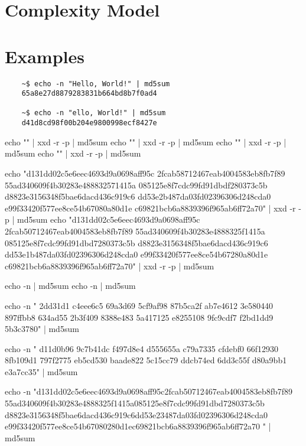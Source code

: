 \section{Complexity Model}


\section{Examples}

\begin{verbatim}
    ~$ echo -n "Hello, World!" | md5sum 
    65a8e27d8879283831b664bd8b7f0ad4
    
    ~$ echo -n "ello, World!" | md5sum 
    d41d8cd98f00b204e9800998ecf8427e
\end{verbatim}

echo "" | xxd -r -p | md5sum
echo "" | xxd -r -p | md5sum
echo "" | xxd -r -p | md5sum
echo "" | xxd -r -p | md5sum

echo "d131dd02c5e6eec4693d9a0698aff95c 2fcab58712467eab4004583eb8fb7f89 55ad340609f4b30283e488832571415a 085125e8f7cdc99fd91dbdf280373c5b d8823e3156348f5bae6dacd436c919c6 dd53e2b487da03fd02396306d248cda0 e99f33420f577ee8ce54b67080a80d1e c69821bcb6a8839396f965ab6ff72a70" | xxd -r -p | md5sum
echo "d131dd02c5e6eec4693d9a0698aff95c 2fcab50712467eab4004583eb8fb7f89 55ad340609f4b30283e4888325f1415a 085125e8f7cdc99fd91dbd7280373c5b d8823e3156348f5bae6dacd436c919c6 dd53e1b487da03fd02396306d248cda0 e99f33420f577ee8ce54b67280a80d1e c69821bcb6a8839396f965ab6ff72a70" | xxd -r -p | md5sum



echo -n  | md5sum 
echo -n  | md5sum 

echo -n " 2dd31d1 c4eee6c5 69a3d69 5cf9af98 87b5ca2f ab7e4612 3e580440 897ffbb8 
 634ad55 2b3f409 8388e483 5a417125 e8255108 9fc9cdf7 f2bd1dd9 5b3c3780" | md5sum 


echo -n " d11d0b96 9c7b41dc f497d8e4 d555655a c79a7335 cfdebf0 66f12930 8fb109d1
 797f2775 eb5cd530 baade822 5c15cc79 ddcb74ed 6dd3c55f d80a9bb1 e3a7cc35" | md5sum 


echo -n "d131dd02c5e6eec4693d9a0698aff95c2fcab50712467eab4004583eb8fb7f89 55ad340609f4b30283e4888325f1415a085125e8f7cdc99fd91dbd7280373c5b d8823e3156348f5bae6dacd436c919c6dd53e23487da03fd02396306d248cda0 e99f33420f577ee8ce54b67080280d1ec69821bcb6a8839396f965ab6ff72a70 " | md5sum 